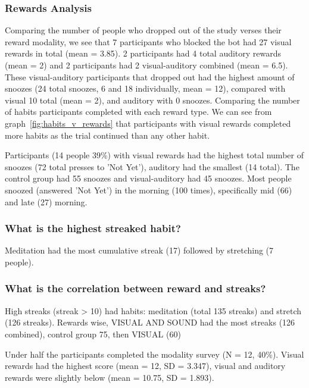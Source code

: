 \documentclass{scaffold/sigchi}
\begin{document}
\subsubsection{Rewards Analysis}

Comparing the number of people who dropped out of the study verses their reward modality, we see that 7 participants who blocked the bot had 27 visual rewards in total (mean = 3.85). 2 participants had 4 total auditory rewards (mean = 2) and 2 participants had 2 visual-auditory combined (mean = 6.5). These visual-auditory participants that dropped out had the highest amount of snoozes (24 total snoozes, 6 and 18 individually, mean = 12), compared with visual 10 total (mean = 2), and auditory with 0 snoozes.\newline
\newline
Comparing the number of habits participants completed with each reward type. We can see from graph~\ref{fig:habits_v_rewards} that participants with visual rewards completed more habits as the trial continued than any other habit.  

Participants (14 people 39\%) with visual rewards had the highest total number of snoozes (72 total presses to 'Not Yet'), auditory had the smallest (14 total). The control group had 55 snoozes and visual-auditory had 45 snoozes. Most people snoozed (answered 'Not Yet') in the morning (100 times), specifically mid (66) and late (27) morning.

\subsubsection{What is the highest streaked habit?}
Meditation had the most cumulative streak (17) followed by stretching (7 people).

\subsubsection{What is the correlation between reward and streaks?}
High streaks (streak > 10) had habits: meditation (total 135 streaks) and stretch (126 streaks). Rewards wise, VISUAL AND SOUND had the most streaks (126 combined), control group 75, then VISUAL (60)





Under half the participants completed the modality survey (N = 12, 40\%). Visual rewards had the highest score (mean = 12, SD = 3.347), visual and auditory rewards were slightly below (mean = 10.75, SD = 1.893).
\end{document}
